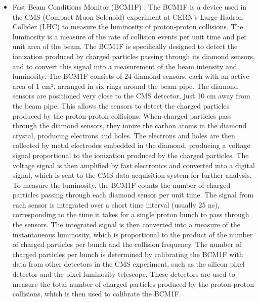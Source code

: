 \begin{itemize}
\item Fast Beam Conditions Monitor (BCM1F) : The BCM1F is a device used in the CMS (Compact Muon Solenoid) experiment at CERN's Large Hadron Collider (LHC) to measure the luminosity of proton-proton collisions. The luminosity is a measure of the rate of collision events per unit time and per unit area of the beam. The BCM1F is specifically designed to detect the ionization produced by charged particles passing through its diamond sensors, and to convert this signal into a measurement of the beam intensity and luminosity. The BCM1F consists of 24 diamond sensors, each with an active area of 1 cm², arranged in six rings around the beam pipe. The diamond sensors are positioned very close to the CMS detector, just 10 cm away from the beam pipe. This allows the sensors to detect the charged particles produced by the proton-proton collisions. When charged particles pass through the diamond sensors, they ionize the carbon atoms in the diamond crystal, producing electrons and holes. The electrons and holes are then collected by metal electrodes embedded in the diamond, producing a voltage signal proportional to the ionization produced by the charged particles. The voltage signal is then amplified by fast electronics and converted into a digital signal, which is sent to the CMS data acquisition system for further analysis. To measure the luminosity, the BCM1F counts the number of charged particles passing through each diamond sensor per unit time. The signal from each sensor is integrated over a short time interval (usually 25 ns), corresponding to the time it takes for a single proton bunch to pass through the sensors. The integrated signal is then converted into a measure of the instantaneous luminosity, which is proportional to the product of the number of charged particles per bunch and the collision frequency. The number of charged particles per bunch is determined by calibrating the BCM1F with data from other detectors in the CMS experiment, such as the silicon pixel detector and the pixel luminosity telescope. These detectors are used to measure the total number of charged particles produced by the proton-proton collisions, which is then used to calibrate the BCM1F.


\end{itemize}
